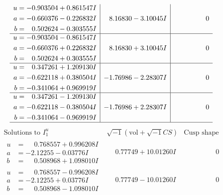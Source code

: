 \documentclass[1p]{elsarticle_modified}
\theoremstyle{definition}
\newcommand{\I}{\sqrt{-1}}
\begin{document}
$$\begin{array}{c|c|c}
\begin{aligned}
u &= -0.903504 + 0.861547 I \\
a &= -0.660376 - 0.226832 I \\
b &= \phantom{-}0.502624 - 0.303555 I\end{aligned}
 & \phantom{-}8.16830 - 3.10045 I & \phantom{-0.000000 } 0 \\ \hline\begin{aligned}
u &= -0.903504 - 0.861547 I \\
a &= -0.660376 + 0.226832 I \\
b &= \phantom{-}0.502624 + 0.303555 I\end{aligned}
 & \phantom{-}8.16830 + 3.10045 I & \phantom{-0.000000 } 0 \\ \hline\begin{aligned}
u &= \phantom{-}0.347261 + 1.209130 I \\
a &= -0.622118 + 0.380504 I \\
b &= -0.341064 + 0.969919 I\end{aligned}
 & -1.76986 - 2.28307 I & \phantom{-0.000000 } 0 \\ \hline\begin{aligned}
u &= \phantom{-}0.347261 - 1.209130 I \\
a &= -0.622118 - 0.380504 I \\
b &= -0.341064 - 0.969919 I\end{aligned}
 & -1.76986 + 2.28307 I & \phantom{-0.000000 } 0\\
 \hline 
 \end{array}$$\newpage$$\begin{array}{c|c|c}  
\text{Solutions to }I^u_{1}& \I (\text{vol} + \sqrt{-1}CS) & \text{Cusp shape}\\
 \hline 
\begin{aligned}
u &= \phantom{-}0.768557 + 0.996208 I \\
a &= -2.12255 - 0.03776 I \\
b &= \phantom{-}0.508968 + 1.098010 I\end{aligned}
 & \phantom{-}0.77749 + 10.01260 I & \phantom{-0.000000 } 0 \\ \hline\begin{aligned}
u &= \phantom{-}0.768557 - 0.996208 I \\
a &= -2.12255 + 0.03776 I \\
b &= \phantom{-}0.508968 - 1.098010 I\end{aligned}
 & \phantom{-}0.77749 - 10.01260 I & \phantom{-0.000000 } 0 \\ \hline\begin{aligned}

\end{aligned}
\end{array}$$
\end{document}
